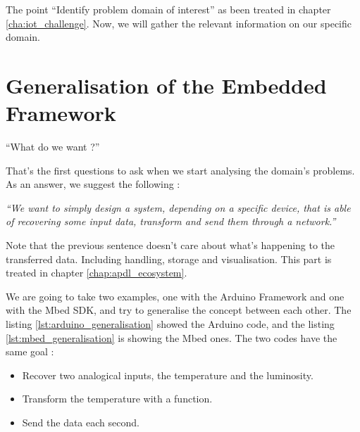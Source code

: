 The point ``Identify problem domain of interest'' as been treated in chapter
\ref{cha:iot_challenge}. Now, we will gather the relevant information on our
specific domain.

\section{Generalisation of the Embedded Framework}
\label{sec:generalisation_framework}

``What do we want ?''

That’s the first questions to ask when we start analysing the domain’s problems.
As an answer, we suggest the following :

{ \Large \textit{``We want to simply design a system, depending on a specific
    device, that is able of recovering some input data, transform and
    send them through a network.''}
}

Note that the previous sentence doesn’t care about what’s happening to the
transferred data. Including handling, storage and visualisation. This part is
treated in chapter \ref{chap:apdl_ecosystem}.

We are going to take two examples, one with the Arduino Framework and one with
the Mbed SDK, and try to generalise the concept between each other. The listing
\ref{lst:arduino_generalisation} showed the Arduino code, and the listing
\ref{lst:mbed_generalisation} is showing the Mbed ones. The two codes have the
same goal :

\begin{itemize}
\item Recover two analogical inputs, the temperature and the luminosity.
\item Transform the temperature with a function.
\item Send the data each second.
\end{itemize}

